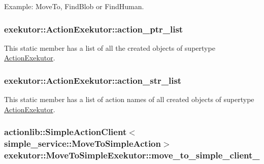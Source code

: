 \-Example\-: \-Move\-To, \-Find\-Blob or \-Find\-Human. \hypertarget{classexekutor_1_1ActionExekutor_a73c4f2607b0725f5b201cf501cb42578}{
\subsubsection[{action\-\_\-ptr\-\_\-list}]{ {\bf exekutor\-::\-Action\-Exekutor\-::action\-\_\-ptr\-\_\-list}}}\label{classexekutor_1_1ActionExekutor_a73c4f2607b0725f5b201cf501cb42578}


\-This static member has a list of all the created objects of supertype \hyperlink{classexekutor_1_1ActionExekutor}{\-Action\-Exekutor}. 

\hypertarget{classexekutor_1_1ActionExekutor_a0dc39a7a2a3a67d2bdd366f9e6e682a2}{
\subsubsection[{action\-\_\-str\-\_\-list}]{ {\bf exekutor\-::\-Action\-Exekutor\-::action\-\_\-str\-\_\-list}}}\label{classexekutor_1_1ActionExekutor_a0dc39a7a2a3a67d2bdd366f9e6e682a2}


\-This static member has a list of action names of all created objects of supertype \hyperlink{classexekutor_1_1ActionExekutor}{\-Action\-Exekutor}. 

\hypertarget{classexekutor_1_1MoveToSimpleExekutor_ae1df451b6050e7e128a4a50211c25c4b}{
\subsubsection[{move\-\_\-to\-\_\-simple\-\_\-client\-\_\-}]{\setlength{\rightskip}{0pt plus 5cm}actionlib\-::\-Simple\-Action\-Client$<$simple\-\_\-service\-::\-Move\-To\-Simple\-Action$>$ {\bf exekutor\-::\-Move\-To\-Simple\-Exekutor\-::move\-\_\-to\-\_\-simple\-\_\-client\-\_\-}}}\label{classexekutor_1_1MoveToSimpleExekutor_ae1df451b6050e7e128a4a50211c25c4b}


